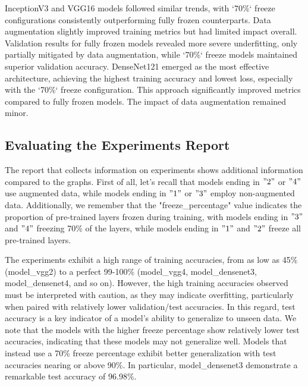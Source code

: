 \vspace{0.3cm}

InceptionV3 and VGG16 models followed similar trends, with `70\%` freeze configurations consistently outperforming
fully frozen counterparts. Data augmentation slightly improved training metrics but had limited impact overall.
Validation results for fully frozen models revealed more severe underfitting, only partially mitigated by data
augmentation, while `70\%` freeze models maintained superior validation accuracy.
DenseNet121 emerged as the most effective architecture, achieving the highest training accuracy and lowest loss,
especially with the `70\%` freeze configuration. This approach significantly improved metrics compared to fully frozen
models. The impact of data augmentation remained minor.

\subsection{Evaluating the Experiments Report}

The report that collects information on experiments shows additional information compared to the graphs. First of all,
let's recall that models ending in \("2"\) or \("4"\) use augmented data, while models ending in \("1"\) or \("3"\) employ non-augmented
data. Additionally, we remember that the "freeze\_percentage" value indicates the proportion of pre-trained layers
frozen during training, with models ending in \("3"\) and \("4"\) freezing 70\% of the layers, while models ending in \("1"\)
and \("2"\) freeze all pre-trained layers.

\vspace{0.3cm}

The experiments exhibit a high range of training accuracies, from as low as 45\% (model\_vgg2) to a perfect 99-100\%
(model\_vgg4, model\_densenet3, model\_densenet4, and so on). However, the high training accuracies observed must be
interpreted with caution, as they may indicate overfitting, particularly when paired with relatively lower validation/test
accuracies. In this regard, test accuracy is a key indicator of a model's ability to generalize to unseen data. We note
that the models with the higher freeze percentage show relatively lower test accuracies, indicating that these models
may not generalize well. Models that instead use a 70\% freeze percentage exhibit better generalization with test
accuracies nearing or above 90\%. In particular, model\_densenet3 demonstrate a remarkable test accuracy of 96.98\%.

